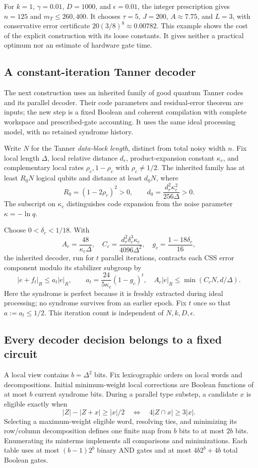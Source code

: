 \documentclass[11pt,a4paper]{article}
\numberwithin{equation}{section}
\theoremstyle{remark}\newtheorem*{remark}{Interpretation}
\newcommand{\eps}{\epsilon}
\begin{document}
For $k=1$, $\gamma=0.01$, $D=1000$, and $\eps=0.01$, the integer prescription gives $n=125$ and $m_T\le260{,}400$. It chooses $\tau=5$, $J=200$, $A\approx7.75$, and $L=3$, with conservative error certificate $20(3/8)^8\approx0.00782$. This example shows the cost of the explicit construction with its loose constants. It gives neither a practical optimum nor an estimate of hardware gate time.

\subsection{A constant-iteration Tanner decoder}
\label{sec:tanner}
The next construction uses an inherited family of good quantum Tanner codes and its parallel decoder. Their code parameters and residual-error theorem are inputs; the new step is a fixed Boolean and coherent compilation with complete workspace and prescribed-gate accounting. It uses the same ideal processing model, with no retained syndrome history.

Write $N$ for the Tanner \emph{data-block length}, distinct from total noisy width $n$. Fix local length $\Delta$, local relative distance $d_r$, product-expansion constant $\kappa_c$, and complementary local rates $\rho_c,1-\rho_c$ with $\rho_c\ne1/2$. The inherited family has at least $R_0N$ logical qubits and distance at least $d_0N$, where
\[
R_0=(1-2\rho_c)^2>0,\qquad
d_0=\frac{d_r^2\kappa_c^2}{256\Delta}>0.
\]
The subscript on $\kappa_c$ distinguishes code expansion from the noise parameter $\kappa=-\ln q$.

Choose $0<\delta_c<1/18$. With
\[
A_c=\frac{48}{\kappa_c\Delta},\quad
C_c=\frac{d_r^2\delta_c^3\kappa_c}{4096\Delta^2},\quad
g_c=\frac{1-18\delta_c}{16},
\]
the inherited decoder, run for $t$ parallel iterations, contracts each CSS error component modulo its stabilizer subgroup by
\[
|e+f_t|_R\le a_t|e|_R,\qquad
a_t=\frac{24}{5\kappa_c}(1-g_c)^t,
\quad A_c|e|_R\le\min(C_cN,d/\Delta).
\]
Here the syndrome is perfect because it is freshly extracted during ideal processing; no syndrome survives from an earlier epoch. Fix $t$ once so that $a:=a_t\le1/2$. This iteration count is independent of $N,k,D,\eps$.

\subsection{Every decoder decision belongs to a fixed circuit}
A local view contains $b=\Delta^2$ bits. Fix lexicographic orders on local words and decompositions. Initial minimum-weight local corrections are Boolean functions of at most $b$ current syndrome bits. During a parallel type substep, a candidate $x$ is eligible exactly when
\[
|Z|-|Z+x|\ge|x|/2
\quad\Longleftrightarrow\quad
4|Z\cap x|\ge3|x|.
\]
Selecting a maximum-weight eligible word, resolving ties, and minimizing its row/column decomposition defines one finite map from $b$ bits to at most $2b$ bits. Enumerating its minterms implements all comparisons and minimizations. Each table uses at most $(b-1)2^b$ binary AND gates and at most $4b2^b+4b$ total Boolean gates.
\end{document}
